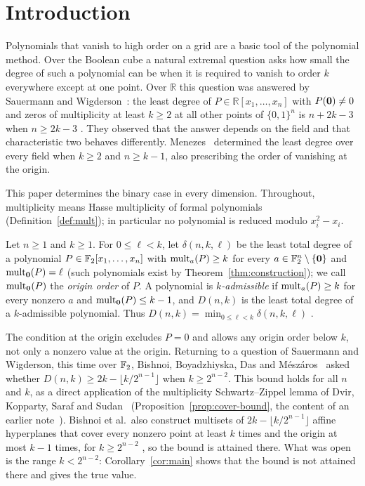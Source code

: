 \section{Introduction}\label{sec:introduction}

Polynomials that vanish to high order on a grid are a basic tool of the
polynomial method. Over the Boolean cube a natural extremal question asks how
small the degree of such a polynomial can be when it is required to vanish to
order \(k\) everywhere except at one point. Over \(\mathbb R\) this question was
answered by Sauermann and Wigderson~\cite{SW20}: the least degree of
\(P\in\mathbb R[x_1,\ldots,x_n]\) with \(P(\mathbf 0)\ne0\) and zeros of multiplicity
at least \(k\ge2\) at all other points of \(\{0,1\}^n\) is \(n+2k-3\) when
\(n\ge2k-3\) \cite[Theorem~1.3]{SW20}. They observed
that the answer depends on the field and that characteristic two behaves
differently. Menezes~\cite{Men26} determined the least degree over every field
when \(k\ge2\) and \(n\ge k-1\), also prescribing the order of vanishing at the
origin.

This paper determines the binary case in every dimension. Throughout,
multiplicity means Hasse multiplicity of formal polynomials
(Definition~\ref{def:mult}); in particular no polynomial is reduced modulo
\(x_i^2-x_i\).

\begin{definition}\label{def:admissible}
Let \(n\ge1\) and \(k\ge1\). For \(0\le\ell<k\), let \(\delta(n,k,\ell)\) be the
least total degree of a polynomial \(P\in\mathbb F_2[x_1,\ldots,x_n]\) with
\(\operatorname{mult}_a(P)\ge k\) for every \(a\in\mathbb F_2^n\setminus\{\mathbf 0\}\) and
\(\operatorname{mult}_{\mathbf 0}(P)=\ell\) (such polynomials exist by
Theorem~\ref{thm:construction}); we call \(\operatorname{mult}_{\mathbf 0}(P)\) the \emph{origin
order} of \(P\). A polynomial is \emph{\(k\)-admissible} if \(\operatorname{mult}_a(P)\ge k\)
for every nonzero \(a\) and \(\operatorname{mult}_{\mathbf 0}(P)\le k-1\), and \(D(n,k)\) is the
least total degree of a \(k\)-admissible polynomial. Thus
\(D(n,k)=\min_{0\le\ell<k}\delta(n,k,\ell)\)
.
\end{definition}

The condition at the origin excludes \(P=0\) and allows any origin order below
\(k\), not only a nonzero value at the origin. Returning to a question of
Sauermann and Wigderson, this time over \(\mathbb F_2\), Bishnoi, Boyadzhiyska, Das and
M\'esz\'aros~\cite[Question~4.3]{BBDM23} asked whether
\(D(n,k)\ge2k-\lfloor k/2^{n-1}\rfloor\) when \(k\ge2^{n-2}\). This bound holds
for all \(n\) and \(k\), as a direct application of the multiplicity
Schwartz--Zippel lemma of Dvir, Kopparty, Saraf and Sudan~\cite{DKSS13}
(Proposition~\ref{prop:cover-bound}, the content of an earlier note~\cite{Note}).
Bishnoi et al.\ also construct multisets of \(2k-\lfloor k/2^{n-1}\rfloor\) affine
hyperplanes that cover every nonzero point at least \(k\) times and the origin at
most \(k-1\) times, for \(k\ge2^{n-2}\) \cite[Theorem~1.2(a)]{BBDM23}, so the bound
is attained there. What was open is the range \(k<2^{n-2}\): Corollary~\ref{cor:main}
shows that the bound is not attained there and gives the true value.

